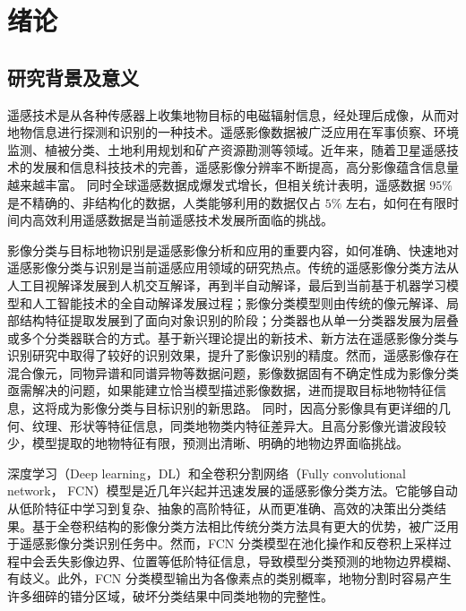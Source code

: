 
\chapter{绪论}
\label{cha:chap01}

\section{研究背景及意义}
\label{sec:first}
%

遥感技术是从各种传感器上收集地物目标的电磁辐射信息，经处理后成像，从而对地物信息进行探测和识别的一种技术。遥感影像数据被广泛应用在军事侦察、环境监测、植被分类、土地利用规划和矿产资源勘测等领域\cite{lishihua2005}。近年来，随着卫星遥感技术的发展和信息科技技术的完善，遥感影像分辨率不断提高，高分影像蕴含信息量越来越丰富。 同时全球遥感数据成爆发式增长，但相关统计表明，遥感数据 $95\%$ 是不精确的、非结构化的数据，人类能够利用的数据仅占 $5\%$ 左右\cite{zhangjun2010}，如何在有限时间内高效利用遥感数据是当前遥感技术发展所面临的挑战。

影像分类与目标地物识别是遥感影像分析和应用的重要内容，如何准确、快速地对遥感影像分类与识别是当前遥感应用领域的研究热点。传统的遥感影像分类方法从人工目视解译发展到人机交互解译，再到半自动解译，最后到当前基于机器学习模型和人工智能技术的全自动解译发展过程；影像分类模型则由传统的像元解译、局部结构特征提取发展到了面向对象识别的阶段；分类器也从单一分类器发展为层叠或多个分类器联合的方式\cite{lideren2012}。基于新兴理论提出的新技术、新方法在遥感影像分类与识别研究中取得了较好的识别效果，提升了影像识别的精度。然而，遥感影像存在混合像元，同物异谱和同谱异物等数据问题\cite{wulun2006}，影像数据固有不确定性成为影像分类亟需解决的问题，如果能建立恰当模型描述影像数据，进而提取目标地物特征信息，这将成为影像分类与目标识别的新思路\cite{he2005comparison}。 同时，因高分影像具有更详细的几何、纹理、形状等特征信息，同类地物类内特征差异大。且高分影像光谱波段较少，模型提取的地物特征有限，预测出清晰、明确的地物边界面临挑战。


深度学习（Deep learning，DL）\cite{hinton2006fast}和全卷积分割网络（Fully convolutional network， FCN）\cite{long2015fully}模型是近几年兴起并迅速发展的遥感影像分类方法。它能够自动从低阶特征中学习到复杂、抽象的高阶特征，从而更准确、高效的决策出分类结果。基于全卷积结构的影像分类方法相比传统分类方法具有更大的优势，被广泛用于遥感影像分类识别任务中。然而，FCN 分类模型在池化操作和反卷积上采样过程中会丢失影像边界、位置等低阶特征信息，导致模型分类预测的地物边界模糊、有歧义。此外，FCN 分类模型输出为各像素点的类别概率，地物分割时容易产生许多细碎的错分区域，破坏分类结果中同类地物的完整性。

